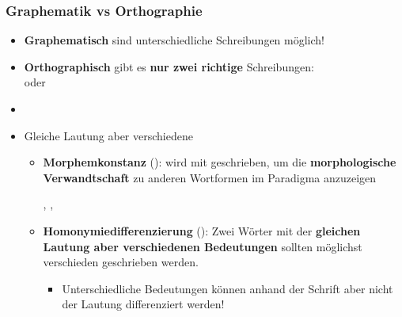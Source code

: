 \begin{frame}
\frametitle{Graphematik vs Orthographie}

\begin{itemize}
	\item \textbf{Graphematisch} sind unterschiedliche Schreibungen möglich!

\pause 
	
	\item \textbf{Orthographisch} gibt es \textbf{nur zwei richtige} Schreibungen: \\
	 oder 
	\item[]
	\item Gleiche Lautung aber verschiedene 
	
	\begin{itemize}
		\item \textbf{Morphemkonstanz} (\su):  wird mit  geschrieben, um die \textbf{morphologische Verwandtschaft} zu anderen Wortformen im Paradigma anzuzeigen 
		
		\ea {}, , 
		\z 

		\item \textbf{Homonymiedifferenzierung} (\su): Zwei Wörter mit der \textbf{gleichen Lautung aber verschiedenen Bedeutungen} sollten möglichst verschieden geschrieben werden.
		
		\begin{itemize}
			\item Unterschiedliche Bedeutungen können anhand der Schrift aber nicht der Lautung differenziert werden!
		\end{itemize}
	\end{itemize}
\end{itemize}

\end{frame}


